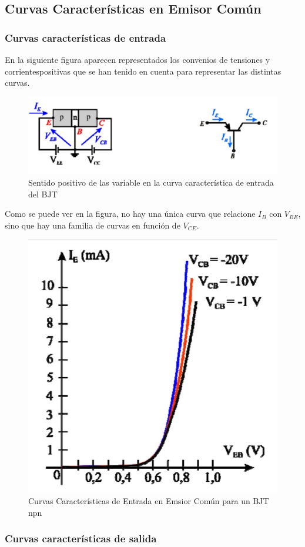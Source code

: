 \documentclass[10pt, a4paper]{article}
\begin{document}
    \subsection{Curvas Características en Emisor Común}

    \subsubsection{Curvas características de entrada}

    En la siguiente figura aparecen representados los convenios de tensiones y corrientespositivas que se han tenido en cuenta para representar las distintas curvas.

    \begin{figure}[h!]
        \centering
        \includegraphics[height=4cm\textwidth]{entrada.jpg}
        \caption{\label{fig:3} Sentido positivo de las variable en la curva característica de entrada del BJT}
    \end{figure}

    Como se puede ver en la figura, no hay una única curva que relacione $I_B$ con $V_{BE}$, sino que hay una familia de curvas en función de $V_{CE}$.

    \begin{figure}[h!]
        \centering
        \includegraphics[height=5cm\textwidth]{graficae.jpg}
        \caption{\label{fig:4} Curvas Características de Entrada en Emsior Común para un BJT npn}
    \end{figure}

    \subsubsection{Curvas características de salida}
\end{document}

